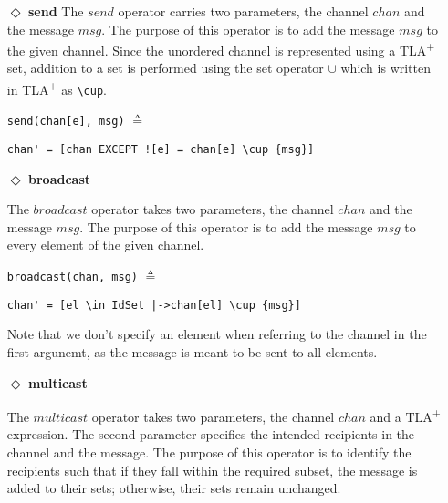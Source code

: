 \documentclass{thesul}
\newcommand{\tlaplus}{TLA\textsuperscript{+}\xspace}
\begin{document}
\begin{itemize}
\item[$\Diamond$]  \textbf{send} The $send$ operator carries two parameters, the channel $chan$ and the message $msg$. The purpose of this operator is to add the message $msg$ to
the given channel. Since the unordered channel is represented using a \tlaplus set, addition to a set is performed using the set operator $\cup$ which is written in \tlaplus as \lstinline|\cup|.


\begin{minipage}{.24\textwidth}

\lstinline|send(chan[e], msg)| $\triangleq$
\end{minipage}\hfill
\begin{minipage}{\textwidth}
\begin{lstlisting}[frame = none, numbers = none]
chan' = [chan EXCEPT ![e] = chan[e] \cup {msg}]
\end{lstlisting}

\end{minipage}\hfill

\item[$\Diamond$]  \textbf{broadcast}

The $broadcast$ operator takes two parameters, the channel $chan$ and the message $msg$. The purpose of this operator is to add the message $msg$ to every element of the given channel.

\begin{minipage}{.25\textwidth}

\lstinline|broadcast(chan, msg)| $\triangleq$
\end{minipage}\hfill
\begin{minipage}{.8\textwidth}
\begin{lstlisting}[frame = none, numbers = none]
chan' = [el \in IdSet |->chan[el] \cup {msg}]
\end{lstlisting}

\end{minipage}\hfill

Note that we don't specify an element when referring to the channel in the first argunemt, as the message is meant to be sent to all elements.
\item[$\Diamond$] \textbf{multicast}

The $multicast$ operator takes two parameters, the channel $chan$ and a \tlaplus expression. The second parameter specifies the intended recipients in the channel and the message. The purpose of this operator is to identify the recipients such that if they fall within the required subset, the message is added to their sets; otherwise, their sets remain unchanged.


\end{itemize}
\end{document}
